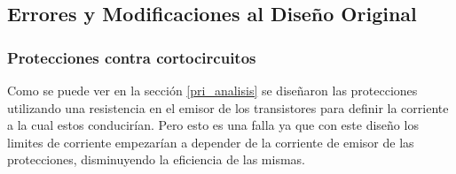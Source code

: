 \subsection{Errores y Modificaciones al Diseño Original}
\bigskip
\subsubsection{Protecciones contra cortocircuitos}
\medskip
Como se puede ver en la sección \ref{pri_analisis} se diseñaron las protecciones utilizando una resistencia en el emisor de los transistores para definir la corriente a la cual estos conducirían. Pero esto es una falla ya que con este diseño los limites de corriente empezarían a depender de la corriente de emisor de las protecciones, disminuyendo la eficiencia de las mismas. 